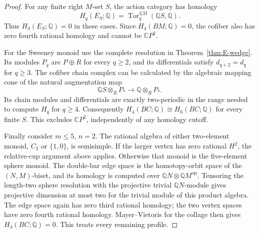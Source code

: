 \begin{proof}
For any finite right $M$-set $S$, the action category has homology
\[
 H_q(E_S;\mathbb Q)
  =\operatorname{Tor}^{\mathbb QM}_q(\mathbb QS,\mathbb Q).
\]
Thus $H_3(E_S;\mathbb Q)=0$ in these cases. Since
$H_4(BM;\mathbb Q)=0$, the cofiber also has zero fourth rational
homology and cannot be $\mathbb CP^2$.

For the Sweeney monoid use the complete resolution in
Theorem~\ref{thm:E-wedge}. Its modules $P_q$ are $P\oplus R$ for
every $q\geq2$, and its differentials satisfy
$d_{q+2}=d_q$ for $q\geq3$. The cofiber chain complex can be calculated by the algebraic
mapping cone of the natural augmentation map
\[
 \mathbb QS\otimes_R P_*\longrightarrow
 \mathbb Q\otimes_R P_*.
\]
Its chain modules and differentials are exactly two-periodic in the
range needed to compute $H_q$ for $q\geq4$. Consequently
$H_4(BC;\mathbb Q)\cong H_6(BC;\mathbb Q)$ for every finite $S$.
This excludes $\mathbb CP^2$, independently of any homology cutoff.

Finally consider $m\leq5$, $n=2$. The rational algebra of either
two-element monoid, $C_2$ or $\{1,0\}$, is semisimple. If the
larger vertex has zero rational $H^2$, the relative-cup argument above
applies. Otherwise that monoid is the five-element sphere monoid.
The double-bar edge space is the homotopy-orbit space of the
$(N,M)$-biset, and its homology is computed over
$\mathbb QN\otimes\mathbb QM^{\mathrm{op}}$. Tensoring the
length-two sphere resolution with the projective trivial
$\mathbb QN$-module gives projective dimension at most two for the
trivial module of this product algebra. The edge space again has
zero third rational homology; the two vertex spaces have zero fourth
rational homology. Mayer--Vietoris for the collage then gives
$H_4(BC;\mathbb Q)=0$. This treats every remaining profile.
\end{proof}

